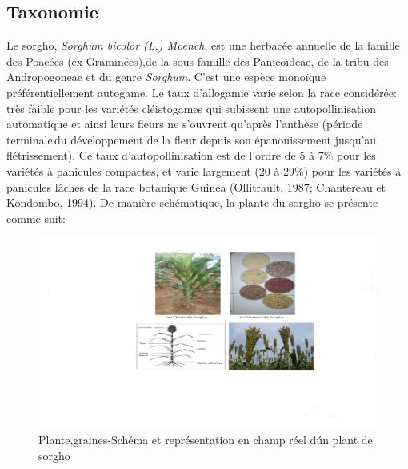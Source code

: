 \documentclass[a4paper,11pt]{article}
\begin{document}
\subsection{Taxonomie}
Le sorgho, \emph{Sorghum bicolor (L.) Moench}, est une herbacée annuelle de
la famille des Poacées (ex-Graminées),de la sous famille des Panicoïdeae,
de la tribu des Andropogoneae et du genre \emph{Sorghum}\cite{Doggett_1988}.
C’est une espèce monoïque préférentiellement autogame. Le taux d’allogamie
varie selon la race considérée: très faible pour les variétés cléistogames qui subissent une
autopollinisation automatique et ainsi leurs fleurs ne s’ouvrent qu’après l’anthèse (période terminale\,du développement de la fleur depuis son épanouissement jusqu’au
flétrissement). Ce taux d'autopollinisation est de l’ordre de 5 à 7\% pour les variétés à
panicules compactes\cite{Doggett_1988}, et varie largement (20 à 29\%)
pour les variétés à panicules lâches de la race botanique Guinea
(Ollitrault, 1987; Chantereau et Kondombo, 1994). De manière
schématique, la plante du sorgho se présente comme suit:





 
\begin{figure}%
  \begin{center}
    \includegraphics[width=16cm]{images/SchemaComposePage5}
  \end{center}
  \caption{Plante,graines-Schéma et représentation en champ réel d\'un plant de sorgho}
   \label{fig-SchemaComposePage5}
\end{figure}
\end{document}
